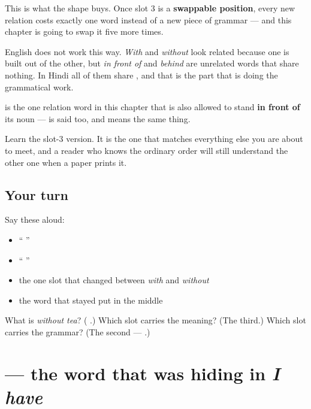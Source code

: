 This is what the shape buys. Once slot 3 is a \textbf{swappable position}, every new relation costs exactly one word instead of a new piece of grammar — and this chapter is going to swap it five more times.

English does not work this way. \emph{With} and \emph{without} look related because one is built out of the other, but \emph{in front of} and \emph{behind} are unrelated words that share nothing. In Hindi all of them share \textbf{}, and that is the part that is doing the grammatical work.

\begin{grammarlens}[title={Grammar Lens: two ways to write it}]
\textbf{} is the one relation word in this chapter that is also allowed to stand \textbf{in front of} its noun — \textbf{  } is said too, and means the same thing.

Learn the slot-3 version. It is the one that matches everything else you are about to meet, and a reader who knows the ordinary order will still understand the other one when a paper prints it.
\end{grammarlens}

\subsection*{Your turn}
Say these aloud:

\begin{itemize}
\raggedright
  \item \textquotedblleft{}  \textquotedblright{}
  \item \textquotedblleft{}  \textquotedblright{}
  \item the one slot that changed between \emph{with} and \emph{without}
  \item the word that stayed put in the middle
\end{itemize}

\begin{tcolorbox}[breakable,colback=teal!4,colframe=teal!35!black,title={Before you move on}]
What is \emph{without tea}? (\textbf{  }.) Which slot carries the meaning? (The third.) Which slot carries the grammar? (The second — \textbf{}.)
\end{tcolorbox}
\section[\texorpdfstring{\hi{घर} \hi{के} \hi{पास} (ghar ke pās)}{घर के पास (ghar ke pās)}]{   — the word that was hiding in \emph{I have}}

